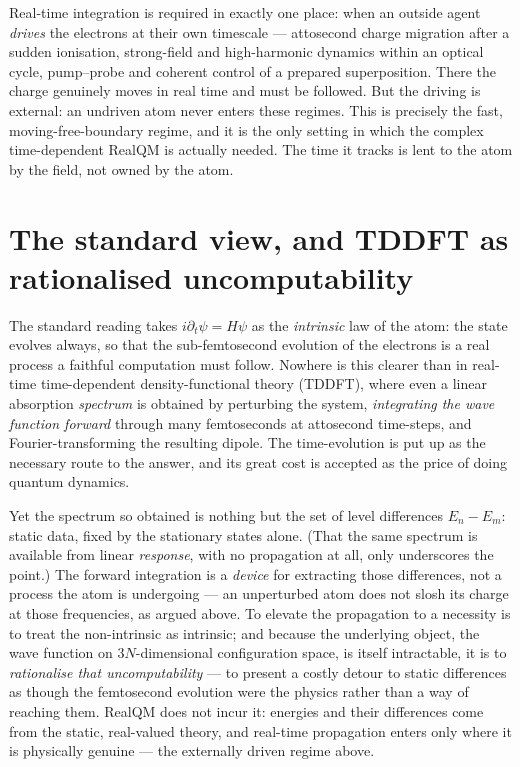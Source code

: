 Real-time integration is required in exactly one place: when an outside agent \emph{drives} the electrons at
their own timescale --- attosecond charge migration after a sudden ionisation, strong-field and high-harmonic
dynamics within an optical cycle, pump--probe and coherent control of a prepared superposition. There the charge
genuinely moves in real time and must be followed. But the driving is external: an undriven atom never enters
these regimes. This is precisely the fast, moving-free-boundary regime, and it is the only setting in which the
complex time-dependent RealQM is actually needed. The time it tracks is lent to the atom by the field, not owned
by the atom.

\section{The standard view, and TDDFT as rationalised uncomputability}\label{sec:tddft}

The standard reading takes $i\partial_t\psi = H\psi$ as the \emph{intrinsic} law of the atom: the state evolves
always, so that the sub-femtosecond evolution of the electrons is a real process a faithful computation must
follow. Nowhere is this clearer than in real-time time-dependent density-functional theory (TDDFT), where even a
linear absorption \emph{spectrum} is obtained by perturbing the system, \emph{integrating the wave function
forward} through many femtoseconds at attosecond time-steps, and Fourier-transforming the resulting dipole. The
time-evolution is put up as the necessary route to the answer, and its great cost is accepted as the price of
doing quantum dynamics.

Yet the spectrum so obtained is nothing but the set of level differences $E_n - E_m$: static data, fixed by the
stationary states alone. (That the same spectrum is available from linear \emph{response}, with no propagation at
all, only underscores the point.) The forward integration is a \emph{device} for extracting those differences,
not a process the atom is undergoing --- an unperturbed atom does not slosh its charge at those frequencies, as
argued above. To elevate the propagation to a necessity is to treat the non-intrinsic as intrinsic; and because
the underlying object, the wave function on $3N$-dimensional configuration space, is itself intractable, it is to
\emph{rationalise that uncomputability} --- to present a costly detour to static differences as though the
femtosecond evolution were the physics rather than a way of reaching them. RealQM does not incur it: energies and
their differences come from the static, real-valued theory, and real-time propagation enters only where it is
physically genuine --- the externally driven regime above.

